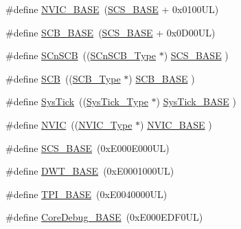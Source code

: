 \begin{DoxyCompactItemize}
\item 
\#define \hyperlink{group___c_m_s_i_s__core__base_gaa0288691785a5f868238e0468b39523d}{N\+V\+I\+C\+\_\+\+B\+A\+SE}~(\hyperlink{group___c_m_s_i_s__core__base_ga3c14ed93192c8d9143322bbf77ebf770}{S\+C\+S\+\_\+\+B\+A\+SE} +  0x0100\+U\+L)
\item 
\#define \hyperlink{group___c_m_s_i_s__core__base_gad55a7ddb8d4b2398b0c1cfec76c0d9fd}{S\+C\+B\+\_\+\+B\+A\+SE}~(\hyperlink{group___c_m_s_i_s__core__base_ga3c14ed93192c8d9143322bbf77ebf770}{S\+C\+S\+\_\+\+B\+A\+SE} +  0x0\+D00\+U\+L)
\item 
\#define \hyperlink{group___c_m_s_i_s__core__base_ga9fe0cd2eef83a8adad94490d9ecca63f}{S\+Cn\+S\+CB}~((\hyperlink{struct_s_cn_s_c_b___type}{S\+Cn\+S\+C\+B\+\_\+\+Type}    $\ast$)     \hyperlink{group___c_m_s_i_s__core__base_ga3c14ed93192c8d9143322bbf77ebf770}{S\+C\+S\+\_\+\+B\+A\+SE}      )
\item 
\#define \hyperlink{group___c_m_s_i_s__core__base_gaaaf6477c2bde2f00f99e3c2fd1060b01}{S\+CB}~((\hyperlink{struct_s_c_b___type}{S\+C\+B\+\_\+\+Type}       $\ast$)     \hyperlink{group___c_m_s_i_s__core__base_gad55a7ddb8d4b2398b0c1cfec76c0d9fd}{S\+C\+B\+\_\+\+B\+A\+SE}      )
\item 
\#define \hyperlink{group___c_m_s_i_s__core__base_gacd96c53beeaff8f603fcda425eb295de}{Sys\+Tick}~((\hyperlink{struct_sys_tick___type}{Sys\+Tick\+\_\+\+Type}   $\ast$)     \hyperlink{group___c_m_s_i_s__core__base_ga58effaac0b93006b756d33209e814646}{Sys\+Tick\+\_\+\+B\+A\+SE}  )
\item 
\#define \hyperlink{group___c_m_s_i_s__core__base_gac8e97e8ce56ae9f57da1363a937f8a17}{N\+V\+IC}~((\hyperlink{struct_n_v_i_c___type}{N\+V\+I\+C\+\_\+\+Type}      $\ast$)     \hyperlink{group___c_m_s_i_s__core__base_gaa0288691785a5f868238e0468b39523d}{N\+V\+I\+C\+\_\+\+B\+A\+SE}     )
\item 
\#define \hyperlink{group___c_m_s_i_s__core__base_ga3c14ed93192c8d9143322bbf77ebf770}{S\+C\+S\+\_\+\+B\+A\+SE}~(0x\+E000\+E000\+U\+L)
\item 
\#define \hyperlink{group___c_m_s_i_s__core__base_gafdab534f961bf8935eb456cb7700dcd2}{D\+W\+T\+\_\+\+B\+A\+SE}~(0x\+E0001000\+U\+L)
\item 
\#define \hyperlink{group___c_m_s_i_s__core__base_ga2b1eeff850a7e418844ca847145a1a68}{T\+P\+I\+\_\+\+B\+A\+SE}~(0x\+E0040000\+U\+L)
\item 
\#define \hyperlink{group___c_m_s_i_s__core__base_ga680604dbcda9e9b31a1639fcffe5230b}{Core\+Debug\+\_\+\+B\+A\+SE}~(0x\+E000\+E\+D\+F0\+U\+L)

\end{DoxyCompactItemize}
